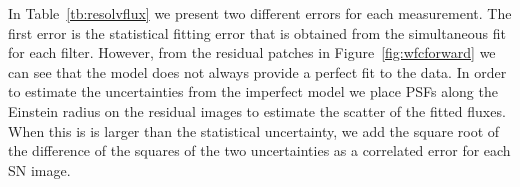 \documentclass[a4paper,fleqn,usenatbib]{mnras}
\newcommand{\sn}{SN\xspace}
\newcommand{\wfcir}{WFC3/IR\xspace}
\begin{document}


%  

In Table~\ref{tb:resolvflux} we present two different errors for each measurement.  The first error is the statistical fitting error that is obtained 
from the simultaneous fit for each filter.  However, from the residual patches in Figure~\ref{fig:wfcforward} we can 
see that the model does not always provide a perfect fit to the data.  In order to estimate the uncertainties from the imperfect model we 
place PSFs along the Einstein radius on the residual images to estimate the scatter of the fitted fluxes.  When this is is larger than the statistical uncertainty, we add the square root of the difference of the squares of the two uncertainties as a correlated error for each \sn image.
\end{document}
